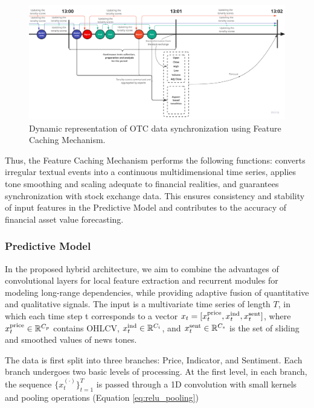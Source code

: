 \begin{figure}[H]
    \centering
    \includegraphics[width=1\linewidth]{img/feature_caching_mechanism.png}
    \caption{Dynamic representation of OTC data synchronization using Feature Caching Mechanism.}
    \label{fig:feature_caching_mechanism}
\end{figure}

Thus, the Feature Caching Mechanism performs the following functions: converts irregular textual events
into a continuous multidimensional time series, applies tone smoothing and scaling adequate to financial
realities, and guarantees synchronization with stock exchange data. This ensures consistency and stability
of input features in the Predictive Model and contributes to the accuracy of financial asset value forecasting.

\subsubsection{Predictive Model}
In the proposed hybrid architecture, we aim to combine the advantages of convolutional layers for local feature
extraction and recurrent modules for modeling long-range dependencies, while providing adaptive fusion of quantitative
and qualitative signals. The input is a multivariate time series of length $T$, in which each time step t corresponds
to a vector $x_t = [x_t^{\rm price}, x_t^{\rm ind}, x_t^{\rm sent}]$, where $x_t^{\rm price}\in\mathbb{R}^{C_p}$ contains
OHLCV, $x_t^{\rm ind}\in\mathbb{R}^{C_i}$, and $x_t^{\rm sent}\in\mathbb{R}^{C_s}$ is the set of sliding and smoothed
values of news tones.

The data is first split into three branches: Price, Indicator, and Sentiment. Each branch undergoes two basic levels
of processing. At the first level, in each branch, the sequence $\{x_t^{(\cdot)}\}_{t=1}^T$ is passed through
a 1D convolution with small kernels and pooling operations (Equation \ref{eq:relu_pooling})

